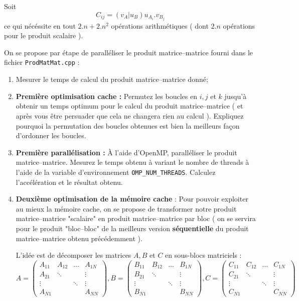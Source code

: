 \documentclass[11pt,a4paper]{article}
\begin{document}
Soit
\[
C_{ij} = \left(v_{A}|u_{B}\right)u_{A_{i}}.v_{B_{j}}
\]
ce qui nécéssite en tout $2.n+2.n^{2}$ opérations arithmétiques ( dont $2.n$ opérations pour le produit scalaire ).

On se propose par étape de paralléliser le produit matrice--matrice fourni dans le fichier \texttt{ProdMatMat.cpp} :

\begin{enumerate}
	\item Mesurer le temps de calcul du produit matrice--matrice donné;
	\item \textbf{\color{blue}Première optimisation cache :} Permutez les  boucles en $i,j$ et $k$ jusqu'à obtenir un temps optimum
	pour le calcul du produit matrice--matrice ( et après vous être persuader que cela ne changera rien au calcul ). Expliquez pourquoi
	la permutation des boucles obtenues est bien la meilleurs façon d'ordonner les boucles.
	\item \textbf{\color{blue}Première parallélisation : } \`A l'aide d'OpenMP, paralléliser le produit matrice--matrice. Mesurez le temps obtenu
	à variant le nombre de threads à l'aide de la variable d'environnement \texttt{OMP\_NUM\_THREADS}. Calculez l'accélération et le résultat obtenu.
	\item \textbf{\color{blue}Deuxième optimisation de la mémoire cache }: 
	Pour pouvoir exploiter au mieux la mémoire cache, on se propose de transformer notre produit matrice--matrice "scalaire" en produit matrice--matrice
	par bloc ( on se servira pour le produit "bloc--bloc" de la meilleurs version \textbf{séquentielle} du produit matrice--matrice obtenu précédemment ).

	L'idée est de décomposer les matrices $A,B$ et $C$ en sous-blocs matriciels :
	\[
	A = \left(
	\begin{array}{cccc}
	A_{11} & A_{12} & \ldots & A_{1N} \\
	A_{21} & \ddots &        & \vdots \\
	\vdots &        & \ddots & \vdots \\
	A_{N1} &        &        & A_{NN}
	\end{array}
	\right),
	B = \left(
	\begin{array}{cccc}
	B_{11} & B_{12} & \ldots & B_{1N} \\
	B_{21} & \ddots &        & \vdots \\
	\vdots &        & \ddots & \vdots \\
	B_{N1} &        &        & B_{NN}
	\end{array}
	\right),
	C = \left(
	\begin{array}{cccc}
	C_{11} & C_{12} & \ldots & C_{1N} \\
	C_{21} & \ddots &        & \vdots \\
	\vdots &        & \ddots & \vdots \\
	C_{N1} &        &        & C_{NN}
	\end{array}
	\right)
	\]


\end{enumerate}
\end{document}
